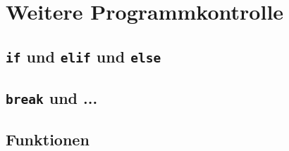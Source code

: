 \chapter{Weitere Programmkontrolle}

\section{\texttt{if} und \texttt{elif} und \texttt{else}}
\section{\texttt{break} und ... }
\section{Funktionen}
